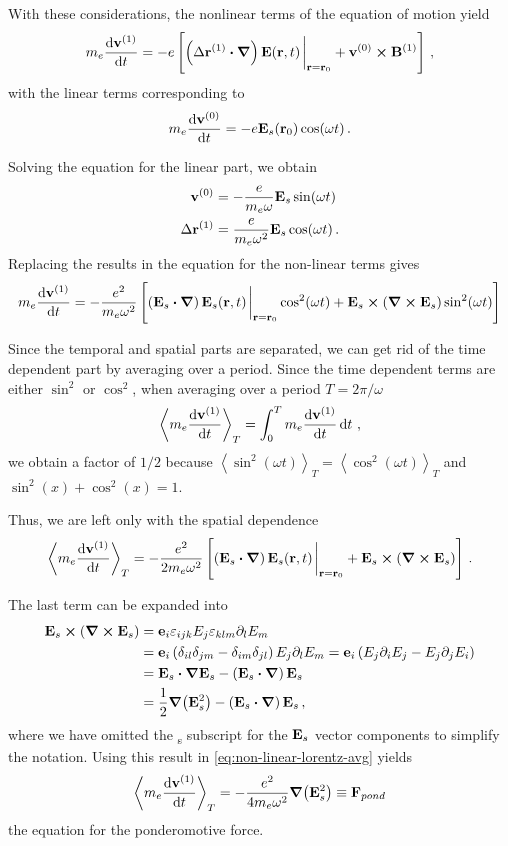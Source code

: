 \documentclass[12pt, class=report, crop=false]{standalone}
\begin{document}
With these considerations, the nonlinear terms of the equation of motion yield
\[
m_e \dv{\vb{v}^{(1)}}{t} = -e \left[
\left(\Delta \vb{r}^{(1)}\vdot\vb*{\nabla}\right)\vb{E}(\vb{r},t)\eval_{\vb{r}=\vb{r}_0} +
\vb{v}^{(0)} \cp \vb{B}^{(1)}
\right]\,,
\]
with the linear terms corresponding to
\[
m_e \dv{\vb{v}^{(0)}}{t} = -e \vb{E}_s(\vb{r}_0)\cos(\omega t)\,.
\]

Solving the equation for the linear part, we obtain
\[
\begin{aligned}
  \vb{v}^{(0)} &= -\frac{e}{m_e \omega} \vb{E}_s \sin(\omega t) \\
  \Delta\vb{r}^{(1)} &= \frac{e}{m_e \omega^2} \vb{E}_s \cos(\omega t)\,.
\end{aligned}
\]
Replacing the results in the equation for the non-linear terms gives
\[
  m_e \dv{\vb{v}^{(1)}}{t} = -\frac{e^2}{m_e\omega^2} \left[
  \left(\vb{E}_s\vdot\vb*{\nabla}\right)\vb{E}_s(\vb{r},t)\eval_{\vb{r}=\vb{r}_0}\cos^2(\omega t) +
  \vb{E}_s \cp (\curl{\vb{E}}_s)\sin^2(\omega t)
  \right]
\]

Since the temporal and spatial parts are separated, we can get rid of the time
dependent part by averaging over a period. Since the time dependent terms are either
\(\sin^2\) or \(\cos^2\), when averaging over a period \(T=2\pi/\omega\)
\[
\left\langle m_e \dv{\vb{v}^{(1)}}{t}\right\rangle_T = \int_0^T m_e \dv{\vb{v}^{(1)}}{t} \dd{t}\,,
\]
we obtain a factor of \(1/2\) because
\(\left\langle\sin^2(\omega t)\right\rangle_T = \left\langle\cos^2(\omega t)\right\rangle_T\) and
\(\sin^2(x) + \cos^2(x)=1\).

Thus, we are left only with the spatial dependence
\begin{equation}
  \label{eq:non-linear-lorentz-avg}
  \left\langle m_e \dv{\vb{v}^{(1)}}{t}\right\rangle_T =
  -\frac{e^2}{2m_e\omega^2} \left[
  \left(\vb{E}_s\vdot\vb*{\nabla}\right)\vb{E}_s(\vb{r},t)\eval_{\vb{r}=\vb{r}_0} +
  \vb{E}_s \cp (\curl{\vb{E}}_s)
  \right]\,.
\end{equation}

The last term can be expanded into
\[
\begin{aligned}
  \vb{E}_s \cp (\curl{\vb{E}}_s) &=
  \vb{e}_i \varepsilon_{ijk}E_j\varepsilon_{klm}\partial_l E_m \\ &=
  \vb{e}_i \left(\delta_{il}\delta_{jm}-\delta_{im}\delta_{jl}\right)E_j\partial_l E_m =
  \vb{e}_i \left(E_j \partial_i E_j - E_j \partial_j E_i\right) \\ &=
  \vb{E}_s\vdot\grad{\vb{E}_s} - \left(\vb{E}_s\vdot\vb*{\nabla}\right)\vb{E}_s \\ &=
  \frac{1}{2}\grad(\vb{E}_s^2) - \left(\vb{E}_s\vdot\vb*{\nabla}\right)\vb{E}_s\,,
\end{aligned}
\]
where we have omitted the \textsubscript{s} subscript for the \(\vb{E}_s\) vector
components to simplify the notation. Using this result in \cref{eq:non-linear-lorentz-avg}
yields
\begin{equation}
  \label{eq:ponderomotive-force}
  \left\langle m_e \dv{\vb{v}^{(1)}}{t}\right\rangle_T =
  -\frac{e^2}{4m_e\omega^2} \grad(\vb{E}_s^2) \equiv \vb{F}_{pond}
\end{equation}
the equation for the ponderomotive force.
\end{document}

